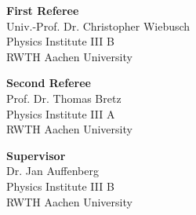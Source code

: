 \cleardoublepage

\vspace*{15cm}

\begin{flushleft}
	\textbf{First Referee}\\
	Univ.-Prof. Dr. Christopher Wiebusch\\
	Physics Institute III B\\
	RWTH Aachen University\\
	\bigskip
	
	\textbf{Second Referee}\\
	Prof. Dr. Thomas Bretz\\
	Physics Institute III A\\
	RWTH Aachen University
	\bigskip
	
	\textbf{Supervisor}\\
	Dr. Jan Auffenberg\\
	Physics Institute III B\\
	RWTH Aachen University\\
\end{flushleft}